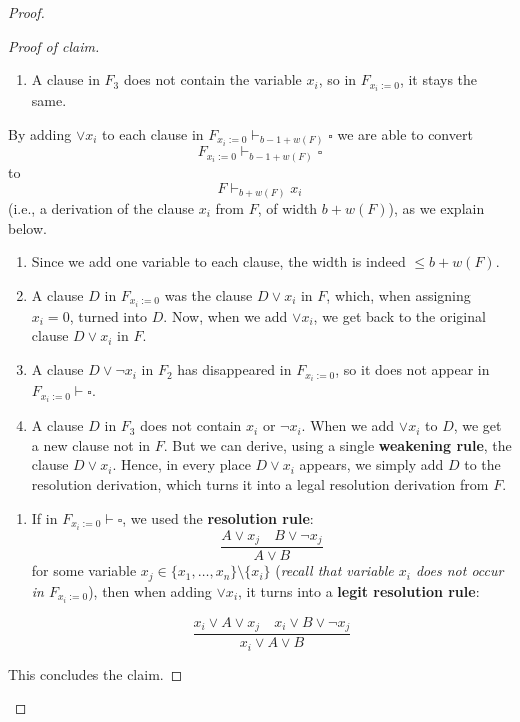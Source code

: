 \begin{proof}
\begin{proof}[Proof of claim]
\begin{enumerate}
    \item A clause in $F_3$ does not contain the variable $x_i$,  
    so in $F_{x_i := 0}$, it stays the same.
\end{enumerate}

By adding $\lor x_i$ to each clause in $F_{x_i := 0} \vdash_{b - 1 + w(F)} \square$ we are able  to convert  
\[
F_{x_i := 0} \vdash_{b - 1 + w(F)} \square
\]  
to  
\[
F \vdash_{b + w(F)} x_i
\]  
(i.e., a derivation of the clause $x_i$ from $F$, of width $b + w(F)$), as we explain below.
\begin{enumerate}
    \item Since we add one variable to each clause, the width is indeed $\leq b + w(F)$.
    
    \item A clause $D$ in $F_{x_i := 0}$ was the clause $D \lor x_i$ in $F$,  
    which, when assigning $x_i = 0$, turned into $D$.  
    Now, when we add $\lor x_i$, we get back to the original clause $D \lor x_i$ in $F$.

    \item A clause $D \lor \neg x_i$ in $F_2$ has disappeared in $F_{x_i := 0}$,  
    so it does not appear in $F_{x_i := 0} \vdash \square$.

    \item A clause $D$ in $F_3$ does not contain $x_i$ or $\neg x_i$.  
    When we add $\lor x_i$ to $D$, we get a new clause not in $F$.  
    But we can derive, using a single \textbf{weakening rule}, the clause $D \lor x_i$.  
    Hence, in every place $D \lor x_i$ appears, we simply add $D$ to the resolution derivation,  
    which turns it into a legal resolution derivation from $F$.
\end{enumerate}

\textbf{ }

\begin{enumerate}
    \item[] If in $F_{x_i := 0} \vdash \square$, we used the \textbf{resolution rule}:
    \[
    \frac{A \lor x_j \quad B \lor \neg x_j}{A \lor B}
    \]
    for some variable $x_j \in \{x_1, \dots, x_n\} \setminus \{x_i\}$  
    (\textit{recall that variable $x_i$ does not occur in $F_{x_i := 0}$}),  
    then when adding $\lor x_i$, it turns into a \textbf{legit resolution rule}:

    \[
    \frac{x_i \lor A \lor x_j \quad x_i \lor B \lor \neg x_j}{x_i \lor A \lor B}
    \]
\end{enumerate}
This concludes the claim. 
\end{proof}


\end{proof}
